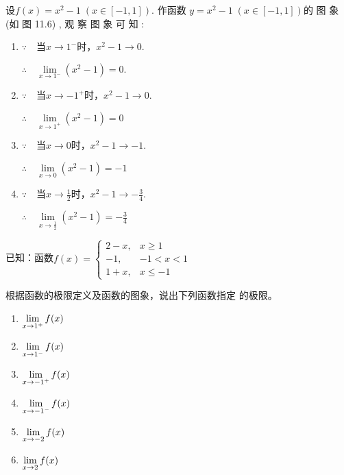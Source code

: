 \begin{solution}
设$f( x) = x^2- 1\; (x\in [ - 1,1])$. 作函数 $y= x^2- 1\; ( x\in [ - 1, 1] )$的 图 象 (如 图  11.6) , 观 察 图 象 可 知 : 

\noindent
\begin{minipage}{.5\textwidth}
\begin{enumerate}[(1)]
    \item $\because\quad $当$x\to1^-$时，$x^2-1\to0$.
    
    $\therefore\quad \lim\limits_{x\to 1^{- }}( x^{2}- 1) = 0.$
    
\item      $\because\quad $当$x\to -1^+$时，$x^2-1\to0$.
    
   $\therefore\quad \lim\limits_{x\to 1^{+ }}( x^{2}- 1) = 0$

   \item      $\because\quad $当$x\to 0$时，$x^2-1\to-1$.
    
   $\therefore\quad \lim\limits_{x\to 0}( x^{2}- 1) = -1$

   \item      $\because\quad $当$x\to \frac{1}{2}$时，$x^2-1\to -\frac{3}{4}$.
    
   $\therefore\quad \lim\limits_{x\to \tfrac{1}{2}}( x^{2}- 1) = -\frac{3}{4}$
\end{enumerate}    
\end{minipage}
\hfill
\begin{minipage}{.4\textwidth}
    \centering
{}
\end{minipage}

\end{solution}

\begin{example}
已知：函数$f(x)=\begin{cases}
    2-x,& x\ge 1\\
    -1,& -1<x<1\\
    1+x,& x\le -1
\end{cases}$

根据函数的极限定义及函数的图象，说出下列函数指定
的极限。
\begin{multicols}{3}
\begin{enumerate}[(1)]
    \item $\lim\limits_{x\to 1^+}f(x)$
    \item $\lim\limits_{x\to 1^-}f(x)$
    \item $\lim\limits_{x\to -1^+}f(x)$
    \item $\lim\limits_{x\to -1^-}f(x)$
    \item $\lim\limits_{x\to -2}f(x)$
    \item $\lim\limits_{x\to 2}f(x)$
\end{enumerate}
\end{multicols}
\end{example}

